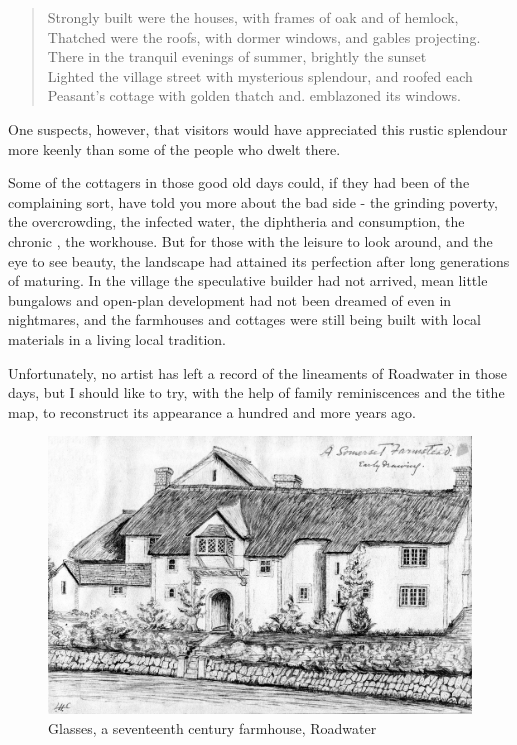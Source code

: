 \begin{quote}
Strongly built were the houses, with frames of oak and of hemlock, \\
Thatched were the roofs, with dormer windows, and gables projecting. \\
There in the tranquil evenings of summer, brightly the sunset \\
Lighted the village street with mysterious splendour, and roofed each  \\
Peasant’s cottage with golden thatch and. emblazoned its windows.
\end{quote}

One suspects, however, that visitors would have appreciated this rustic splendour more keenly than some of the people who dwelt there. 

Some of the cottagers in those good old days could, if they had been of the complaining sort, have told you more about the bad side - the grinding poverty, the overcrowding, the infected water, the diphtheria and consumption, the chronic , the workhouse. But for those with the leisure to look around, and the eye to see beauty, the landscape had attained its perfection after long generations of maturing. In the village the speculative builder had not arrived, mean little bungalows and open-plan development had not been dreamed of even in nightmares, and the farmhouses and cottages were still being built with local materials in a living local tradition.

Unfortunately, no artist has left a record of the lineaments of Roadwater in those days, but I should like to try, with the help of family reminiscences and the tithe map, to reconstruct its appearance a hundred and more years ago.

\begin{figure}[p]
     \includegraphics[width=1\textwidth]{figures/Glasses}
     \caption{Glasses, a seventeenth century farmhouse, Roadwater}
     \label{fig:Glasses}
\end{figure}


